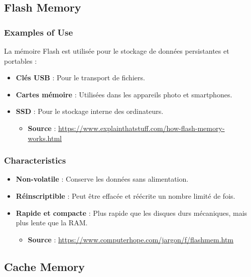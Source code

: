 \documentclass[10pt,a4paper]{article}
\begin{document}
\subsection*{Flash Memory}

\subsubsection*{Examples of Use}
La mémoire Flash est utilisée pour le stockage de données persistantes et portables :
\begin{itemize}
    \item \textbf{Clés USB} : Pour le transport de fichiers.
    \item \textbf{Cartes mémoire} : Utilisées dans les appareils photo et smartphones.
    \item \textbf{SSD} : Pour le stockage interne des ordinateurs.
    \begin{itemize}
        \item \textbf{Source} : \url{https://www.explainthatstuff.com/how-flash-memory-works.html}
    \end{itemize}
\end{itemize}

\subsubsection*{Characteristics}
\begin{itemize}
    \item \textbf{Non-volatile} : Conserve les données sans alimentation.
    \item \textbf{Réinscriptible} : Peut être effacée et réécrite un nombre limité de fois.
    \item \textbf{Rapide et compacte} : Plus rapide que les disques durs mécaniques, mais plus lente que la RAM.
    \begin{itemize}
        \item \textbf{Source} : \url{https://www.computerhope.com/jargon/f/flashmem.htm}
    \end{itemize}
\end{itemize}

\subsection*{Cache Memory}
\end{document}

